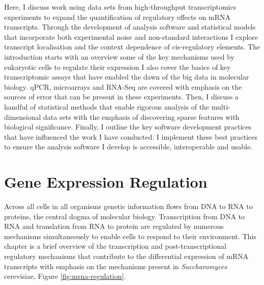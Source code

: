 \documentclass[../main.tex]{subfiles}
\begin{document}
Here, I discuss work using data sets from high-throughput transcriptomics experiments to expand the quantification of regulatory effects on mRNA transcripts. 
Through the development of analysis software and statistical models that incorporate both experimental noise and non-standard interactions I explore transcript localisation and the context dependence of cis-regulatory elements. 
The introduction starts with an overview some of the key mechanisms used by eukaryotic cells to regulate their expression 
I also cover the basics of key transcriptomic assays that have enabled the dawn of the big data in molecular biology. 
qPCR, microarrays and RNA-Seq are covered with emphasis on the sources of error that can be present in these experiments. 
Then, I discuss a handful of statistical methods that enable rigorous analysis of the multi-dimensional data sets with the emphasis of discovering sparse features with biological significance. 
Finally, I outline the key software development practices that have influenced the work I have conducted. 
I implement these best practices to ensure the analysis software I develop is accessible, interoperable and usable.

\newpage

\section{Gene Expression Regulation}

Across all cells in all organisms genetic information flows from DNA to RNA to proteins, the central dogma of molecular biology.
Transcription from DNA to RNA and translation from RNA to protein are regulated by numerous mechanisms simultaneously to enable cells to respond to their environment.
This chapter is a brief overview of the transcription and post-transcriptional regulatory mechanisms that contribute to the differential expression of mRNA transcripts with emphasis on the mechanisms present in \textit{Saccharomyces} cerevisiae, Figure \ref{fig:mrna-regulation}. 
\end{document}
